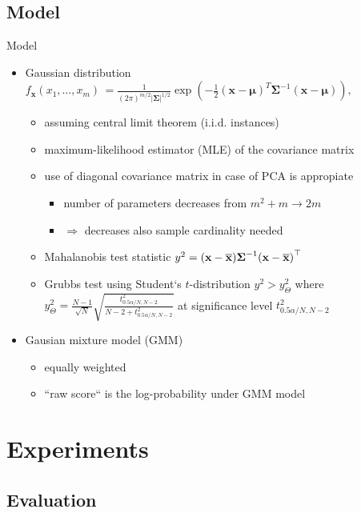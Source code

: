 \documentclass{beamer}
\begin{document}
\subsection{Model}
\begin{frame}{Model}
\begin{itemize}
	\item<1-> Gaussian distribution $f_{\mathbf x}(x_1,\ldots,x_m)\, =
\frac{1}{(2\pi)^{m/2}|\boldsymbol\Sigma|^{1/2}}
\exp\left(-\frac{1}{2}({\mathbf x}-{\boldsymbol\mu})^T{\boldsymbol\Sigma}^{-1}({\mathbf x}-{\boldsymbol\mu})
\right),
$
	\begin{itemize}
	\item<2-> assuming central limit theorem (i.i.d. instances)
	\item<3-> maximum-likelihood estimator (MLE) of the covariance matrix
	\item<4-> use of diagonal  covariance matrix in case of PCA is appropiate
	\begin{itemize}
		\item<4-> number of parameters decreases from $m^2+m\rightarrow 2m$
		\item<5-> $\Rightarrow$ decreases also sample cardinality needed
	\end{itemize}
	\item<6-> \alert<8>{Mahalanobis test statistic $y^2 = {\left({ \mathbf{x} - \overline{\mathbf{x}} }\right)}{\boldsymbol\Sigma}^{-1}{\left({ \mathbf{x} - \overline{\mathbf{x}} }\right)}^\top$}
	\item<7-> Grubbs test using Student`s $t$-distribution ${y^2} > y^2_\Theta$ where $ y^2_\Theta = \frac{N-1}{\sqrt{N}}\sqrt{\frac{t^2_{0.5\alpha/N,N-2}}{N-2+t^2_{0.5\alpha/N,N-2}}}$ at significance level $t^2_{0.5\alpha/N,N-2}$
	\end{itemize}
	\item<9-> Gausian mixture model (GMM)
	\begin{itemize}
	\item<10-> equally weighted
	\item<11-> ``raw score`` is the log-probability under GMM model
	\end{itemize}
\end{itemize}
\end{frame}

\section{Experiments}
\subsection{Evaluation}
\end{document}
